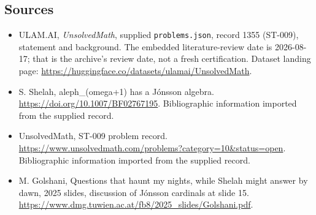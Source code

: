 \documentclass[11pt,a4paper]{article}
\begin{document}
\subsection{Sources}

{\small

\begin{itemize}

\item[\hypertarget{source:1355:1}{S1}] ULAM.AI, \emph{UnsolvedMath}, supplied \texttt{problems.json}, record 1355 (ST-009), statement and background. The embedded literature-review date is 2026-08-17; that is the archive’s review date, not a fresh certification. Dataset landing page: \url{https://huggingface.co/datasets/ulamai/UnsolvedMath}.

\item[\hypertarget{source:1355:2}{S2}] S. Shelah, aleph\_(omega+1) has a Jónsson algebra. \url{https://doi.org/10.1007/BF02767195}. Bibliographic information imported from the supplied record.

\item[\hypertarget{source:1355:3}{S3}] UnsolvedMath, ST-009 problem record. \url{https://www.unsolvedmath.com/problems?category=10&status=open}. Bibliographic information imported from the supplied record.

\item[R1] M. Golshani, Questions that haunt my nights, while Shelah might answer by dawn, 2025 slides, discussion of Jónsson cardinals at slide 15.
\url{https://www.dmg.tuwien.ac.at/fb8/2025_slides/Golshani.pdf}.
\end{itemize}

}

\label{end:1355}
\end{document}
